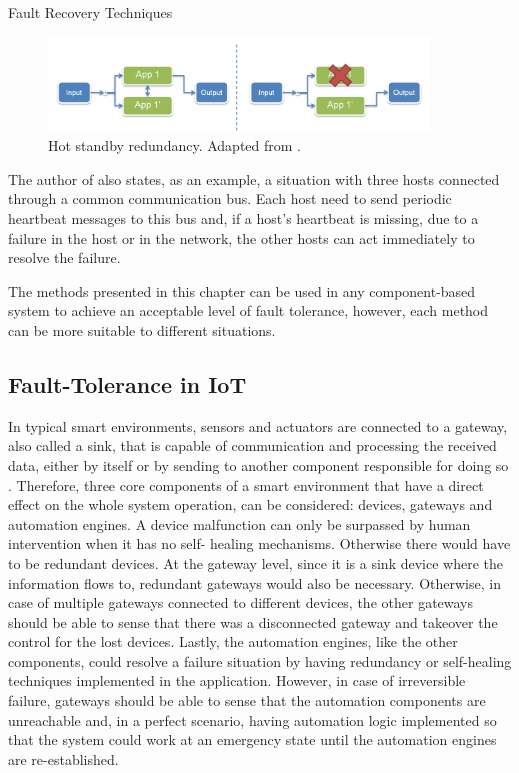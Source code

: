 \begin{Paragraph}{Fault Recovery Techniques}
	\begin{figure}[H]
		\centering
		\includegraphics[width=0.9\textwidth]{figures/hotstandby.png}
		\caption{Hot standby redundancy. Adapted from \cite{Schweiz}.}
		\label{fig:hot_standby}
	\end{figure}
	
	The author of \cite{Schweiz} also states, as an example, a situation with three hosts connected through a common communication bus. Each host need to send periodic heartbeat messages to this bus and, if a host's heartbeat is missing, due to a failure in the host or in the network, the other hosts can act immediately to resolve the failure.
	
\end{Paragraph}

The methods presented in this chapter can be used in any component-based system to achieve an acceptable level of fault tolerance, however, each method can be more suitable to different situations. 

\subsection{Fault-Tolerance in IoT}


In typical smart environments, sensors and actuators are connected to a gateway, also called a sink, that is capable of communication and processing the received data, either by itself or by sending to another component responsible for doing so \cite{Gia2015}. Therefore, three core components of a smart environment that have a direct effect on the whole system operation, can be considered: devices, gateways and automation engines. A device malfunction can only be surpassed by human intervention when it has no self- healing mechanisms. Otherwise there would have to be redundant devices. At the gateway level, since it is a sink device where the information flows to, redundant gateways would also be necessary. Otherwise, in case of multiple gateways connected to different devices, the other gateways should be able to sense that there was a disconnected gateway and takeover the control for the lost devices. Lastly, the automation engines, like the other components, could resolve a failure situation by having redundancy or self-healing techniques implemented in the application. However, in case of irreversible failure, gateways should be able to sense that the automation components are unreachable and, in a perfect scenario, having automation logic implemented so that the system could work at an emergency state until the automation engines are re-established.


